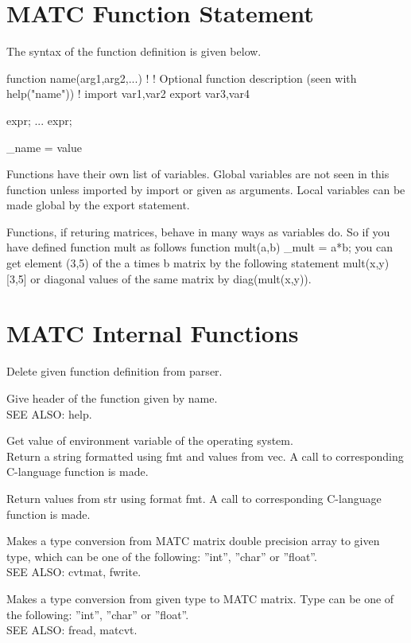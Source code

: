 \section{MATC Function Statement}


The syntax of the function definition is given below. 

\ttbegin
function name(arg1,arg2,...)
!
! Optional function description (seen with help("name"))
!
import var1,var2
export var3,var4
{
    expr;
     ...
    expr;

    \_name = value
}
\ttend

Functions have their own list of variables. Global variables are not seen in this 
function unless imported by import or given as arguments. Local variables can be made global by the export statement. 

Functions, if returing matrices, behave in many ways as variables do. So if you have defined function mult as follows 
\ttbegin
function mult(a,b)
{
   _mult = a*b;
}
\ttend
you can get element (3,5) of the a times b matrix by the following statement 
\ttbegin
mult(x,y)[3,5]
\ttend
or diagonal values of the same matrix by 
\ttbegin
diag(mult(x,y)).
\ttend


\section{MATC Internal Functions}

\sifbegin
{}
Delete given function definition from parser. 

Give header of the function given by name. \\
SEE ALSO: help. 

Get value of environment variable of the operating system. \\

Return a string formatted using fmt and values from vec. A call to corresponding C-language function is made. 

Return values from str using format fmt. A call to corresponding C-language function is made. 

Makes a type conversion from MATC matrix double precision array to given type, 
which can be one of the following: ''int'', ''char'' or ''float''. \\
SEE ALSO: cvtmat, fwrite. 

Makes a type conversion from given type to MATC matrix. Type can be one of the following: ''int'', ''char'' or ''float''. \\
SEE ALSO: fread, matcvt. 

